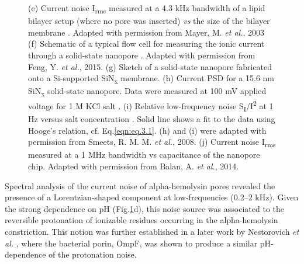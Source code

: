 \begin{figure}[H]
{		(e)  Current noise I\textsubscript{rms} measured at a 4.3 kHz bandwidth of a lipid bilayer setup (where no pore was inserted) \emph{vs} the size of the bilayer membrane \cite{Mayer2003}. Adapted with permission from Mayer, M. \emph{et al.}, 2003
		(f) Schematic of a typical flow cell for measuring the ionic current through a solid-state nanopore \cite{Feng2015a}. Adapted with permission from Feng, Y. \emph{et al.}, 2015.
		(g) Sketch of a solid-state nanopore fabricated onto a Si-supported SiN\textsubscript{x} membrane. (h) Current PSD for a 15.6 nm SiN\textsubscript{x} solid-state nanopore. Data were measured at 100 mV applied voltage for 1 M KCl salt \cite{Smeets2008}. 
		(i) Relative low-frequency noise S\textsubscript{I}/I\textsuperscript{2} at 1 Hz versus salt concentration \cite{Smeets2008}. Solid line shows a fit to the data using Hooge’s relation, cf. Eq.\ref{eqn:eq.3.1}. (h) and (i) were adapted with permission from Smeets, R. M. M. \emph{et al.}, 2008.
		(j) Current noise I\textsubscript{rms} measured at a 1 MHz bandwidth vs capacitance of the nanopore chip\cite{Balan2014}. Adapted with permission from Balan, A. \emph{et al.}, 2014.
	}
	\label{fig:fig3.3}
\end{figure}



 Spectral analysis of the current noise of alpha-hemolysin pores revealed the presence of a Lorentzian-shaped component at low-frequencies ($0.2$–$2$ kHz). Given the strong dependence on pH (Fig.\ref{fig:fig3.3}d), this noise source was associated to the reversible protonation of ionizable residues occurring in the alpha-hemolysin constriction. This notion was further established in a later work by Nestorovich \emph{et al.} \cite{Nestorovich2003}, where the bacterial porin, OmpF, was shown to produce a similar pH-dependence of the protonation noise. 





